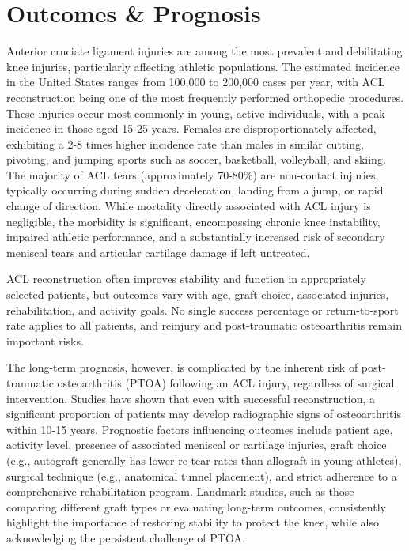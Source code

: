 \section*{Outcomes \& Prognosis}
Anterior cruciate ligament injuries are among the most prevalent and debilitating knee injuries, particularly affecting athletic populations. The estimated incidence in the United States ranges from 100,000 to 200,000 cases per year, with ACL reconstruction being one of the most frequently performed orthopedic procedures. These injuries occur most commonly in young, active individuals, with a peak incidence in those aged 15-25 years. Females are disproportionately affected, exhibiting a 2-8 times higher incidence rate than males in similar cutting, pivoting, and jumping sports such as soccer, basketball, volleyball, and skiing. The majority of ACL tears (approximately 70-80\%) are non-contact injuries, typically occurring during sudden deceleration, landing from a jump, or rapid change of direction. While mortality directly associated with ACL injury is negligible, the morbidity is significant, encompassing chronic knee instability, impaired athletic performance, and a substantially increased risk of secondary meniscal tears and articular cartilage damage if left untreated.

ACL reconstruction often improves stability and function in appropriately selected patients, but outcomes vary with age, graft choice, associated injuries, rehabilitation, and activity goals. No single success percentage or return-to-sport rate applies to all patients, and reinjury and post-traumatic osteoarthritis remain important risks.

The long-term prognosis, however, is complicated by the inherent risk of post-traumatic osteoarthritis (PTOA) following an ACL injury, regardless of surgical intervention. Studies have shown that even with successful reconstruction, a significant proportion of patients may develop radiographic signs of osteoarthritis within 10-15 years. Prognostic factors influencing outcomes include patient age, activity level, presence of associated meniscal or cartilage injuries, graft choice (e.g., autograft generally has lower re-tear rates than allograft in young athletes), surgical technique (e.g., anatomical tunnel placement), and strict adherence to a comprehensive rehabilitation program. Landmark studies, such as those comparing different graft types or evaluating long-term outcomes, consistently highlight the importance of restoring stability to protect the knee, while also acknowledging the persistent challenge of PTOA.

